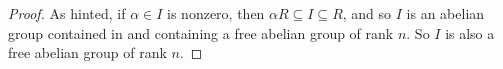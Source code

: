 \begin{proof}
	As hinted, if $\alpha \in I$ is nonzero, then $\alpha R \subseteq I \subseteq R$, and so $I$ is an abelian group contained in and containing a free abelian group of rank $n$. So $I$ is also a free abelian group of rank $n$.
\end{proof}
